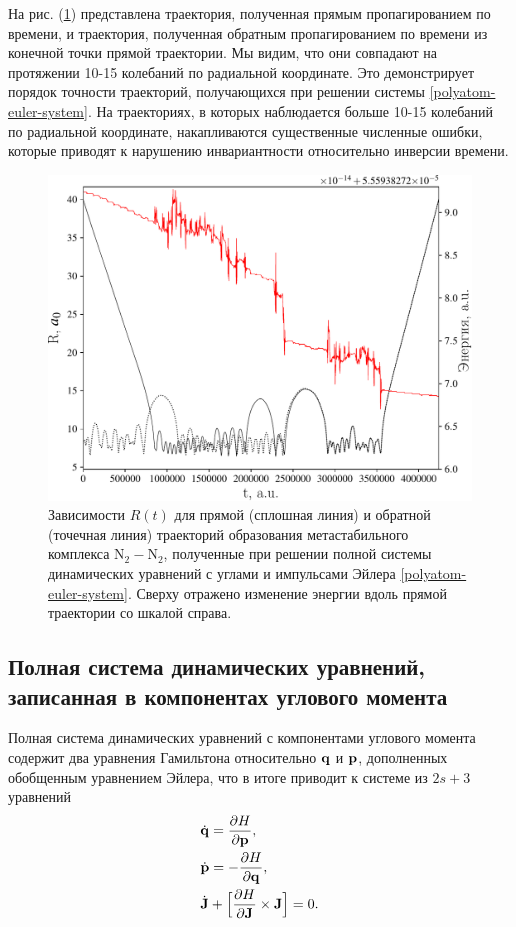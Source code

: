 На рис. (\ref{fig:euler-trajectory}) представлена траектория, полученная прямым пропагированием по времени, и траектория, полученная обратным пропагированием по времени из конечной точки прямой траектории. Мы видим, что они совпадают на протяжении 10-15 колебаний по радиальной координате. Это демонстрирует порядок точности траекторий, получающихся при решении системы \eqref{polyatom-euler-system}. На траекториях, в которых наблюдается больше 10-15 колебаний по радиальной координате, накапливаются существенные численные ошибки, которые приводят к нарушению инвариантности относительно инверсии времени.

\setcounter{figure}{3}
\begin{figure}[H]
    \centering
    \includegraphics[width=0.75\linewidth]{./pictures/trajectories/euler_trajectory-crop.pdf}
\caption{Зависимости $R(t)$ для прямой (сплошная линия) и обратной (точечная линия) траекторий образования метастабильного комплекса N$_2-$N$_2$, полученные при решении полной системы динамических уравнений с углами и импульсами Эйлера \eqref{polyatom-euler-system}. Сверху отражено изменение энергии вдоль прямой траектории со шкалой справа.}
    \label{fig:euler-trajectory}
\end{figure}

\subsection{Полная система динамических уравнений, записанная в компонентах углового момента}
    Полная система динамических уравнений с компонентами углового момента содержит два уравнения Гамильтона относительно $\mathbf{q}$ и $\mathbf{p}$, дополненных обобщенным уравнением Эйлера, что в итоге приводит к системе из $2s + 3$ уравнений
\begin{gather}
    \begin{aligned}
        &\dot{\mathbf{q}} = \frac{\partial H}{\partial \mathbf{p}}, \\
        &\dot{\mathbf{p}} = -\frac{\partial H}{\partial \mathbf{q}}, \\
        &\dot{\mathbf{J}} + \Big[ \frac{\partial H}{\partial \mathbf{J}} \times \mathbf{J} \Big] = 0.
    \end{aligned}
\end{gather}

